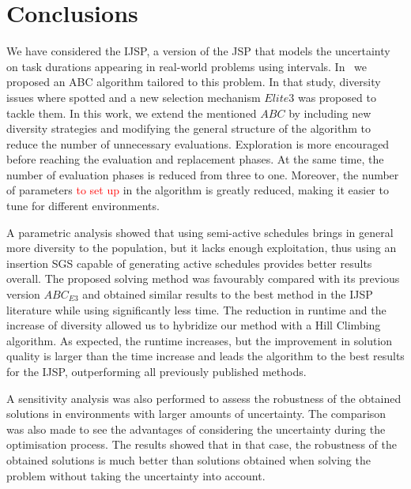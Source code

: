 \documentclass[sn-mathphys]{sn-jnl}%
\theoremstyle{thmstyleone}%
\theoremstyle{thmstyletwo}%
\theoremstyle{thmstylethree}%
\newcommand{\review}[1]{\textcolor{red}{#1}} %
\begin{document}
\section{Conclusions}
We have considered the IJSP, a version of the JSP that models the uncertainty on task durations appearing in real-world problems using intervals. In~\cite{Diaz2022} we proposed an ABC algorithm tailored to this problem. In that study, diversity issues where spotted and a new selection mechanism $Elite3$ was proposed to tackle them. In this work, we extend the mentioned $ABC$ by including new diversity strategies and modifying the general structure of the algorithm to reduce the number of unnecessary evaluations. Exploration is more encouraged before reaching the evaluation and replacement phases. At the same time, the number of evaluation phases is reduced from three to one. Moreover, the number of parameters \review{to set up} in the algorithm is greatly reduced, making it easier to tune for different environments.

A parametric analysis showed that using semi-active schedules brings in general more diversity to the population, but it lacks enough exploitation, thus using an insertion SGS capable of generating active schedules provides better results overall. The proposed solving method was favourably compared with its previous version $ABC_{E3}$ and obtained similar results to the best method in the IJSP literature while using significantly less time. The reduction in runtime and the increase of diversity allowed us to hybridize our method with a Hill Climbing algorithm. As expected, the runtime increases, but the improvement in solution quality is larger than the time increase and leads the algorithm to the best results for the IJSP, outperforming all previously published methods.

A sensitivity analysis was also performed to assess the robustness of the obtained solutions in environments with larger amounts of uncertainty. The comparison was also made to see the advantages of considering the uncertainty during the optimisation process. The results showed that in that case, the robustness of the obtained solutions is much better than solutions obtained when solving the problem without taking the uncertainty into account.




\backmatter
\end{document}
